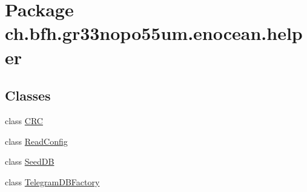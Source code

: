 \hypertarget{namespacech_1_1bfh_1_1gr33nopo55um_1_1enocean_1_1helper}{}\section{Package ch.\+bfh.\+gr33nopo55um.\+enocean.\+helper}
\label{namespacech_1_1bfh_1_1gr33nopo55um_1_1enocean_1_1helper}
\subsection*{Classes}
\begin{DoxyCompactItemize}
\item 
class \hyperlink{classch_1_1bfh_1_1gr33nopo55um_1_1enocean_1_1helper_1_1_c_r_c}{C\+RC}
\item 
class \hyperlink{classch_1_1bfh_1_1gr33nopo55um_1_1enocean_1_1helper_1_1_read_config}{Read\+Config}
\item 
class \hyperlink{classch_1_1bfh_1_1gr33nopo55um_1_1enocean_1_1helper_1_1_seed_d_b}{Seed\+DB}
\item 
class \hyperlink{classch_1_1bfh_1_1gr33nopo55um_1_1enocean_1_1helper_1_1_telegram_d_b_factory}{Telegram\+D\+B\+Factory}
\end{DoxyCompactItemize}
